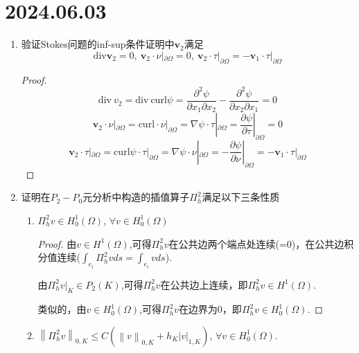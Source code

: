 \documentclass[12pt,a4paper]{article}
\begin{document}
	
	\noindent
	
	\section*{2024.06.03}	
	
	\begin{enumerate}
		
		\item 验证Stokes问题的inf-sup条件证明中$\mathbf{v}_2$满足
		$$\mathrm{div} \mathbf{v}_2=0,\:\mathbf{v}_2\cdot\nu|_{\partial\Omega}=0,\:\mathbf{v}_2\cdot\tau|_{\partial\Omega}=-\mathbf{v}_1\cdot\tau|_{\partial\Omega}$$
		
		\begin{proof}
			$$\mathrm{div} \  v_2 = \mathrm{div} \ \mathrm{curl} \psi = \frac{\partial^2 \psi}{\partial x_1 \partial x_2} - \frac{\partial^2 \psi}{\partial x_2 \partial x_1} = 0  $$
			$$\mathbf{v}_2\cdot\nu|_{\partial\Omega}=\mathrm{curl} \cdot \nu|_{\partial \Omega}=\nabla \psi \cdot \tau |_{\partial \Omega}=\frac{\partial \psi}{\partial \tau} |_{\partial\Omega}=0$$
			$$\mathbf{v}_2\cdot\tau|_{\partial\Omega}=\mathrm{curl} \psi \cdot \tau|_{\partial\Omega}=\nabla \psi \cdot \nu |_{\partial\Omega}=- \frac{\partial \psi}{\partial \nu}|_{\partial \Omega}=-\mathbf{v}_1\cdot\tau|_{\partial\Omega}$$
		\end{proof}
		
		\item 证明在$P_2-P_0$元分析中构造的插值算子$\Pi_h^{2}$满足以下三条性质
		
		\begin{enumerate}
			\item $\Pi _{h}^{2}v\in H_{0}^{1}( \Omega )$, $\forall v\in H_{0}^{1}( \Omega )$
			
			\begin{proof}
				由$v \in H^1(\Omega)$,可得$\Pi_h^2 v$在公共边两个端点处连续(=0)，在公共边积分值连续($\int_{e_i} \Pi_h^2 v ds= \int_{e_i} v ds$).
				
				由$\Pi_h^2 v|_K \in P_2(K)$,可得$\Pi_h^2 v$在公共边上连续，即$\Pi_h^2 v \in H^1(\Omega)$.
				
				类似的，由$v \in H_0^1(\Omega)$,可得$\Pi_h^2 v$在边界为0，即$\Pi_h^2 v \in H_0^1(\Omega)$.
			\end{proof}
			
			\item $ \left \| \Pi _h^2v\right \| _{0, K}\leq C\left ( \left \| v\right \| _{0, K}+ h_K\left | v\right | _{1, K}\right )$, $\forall v\in H_0^1( \Omega )$.
			

\end{enumerate}
\end{enumerate}
\end{document}
